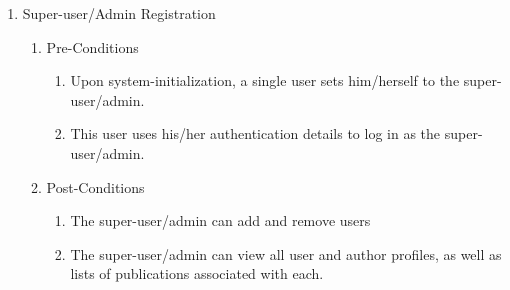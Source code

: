 \documentclass[hidelinks,a4paper,12pt]{article}
\begin{document}
	\noindent  
	
	\begin{enumerate}
		\item  Super-user/Admin Registration
		
		\begin{enumerate}
			\item  Pre-Conditions
			
			\begin{enumerate}
				\item  Upon system-initialization, a single user sets him/herself to the super-user/admin.
				
				\item  This user uses his/her authentication details to log in as the super-user/admin.
			\end{enumerate}
			
			\item  Post-Conditions
			
			\begin{enumerate}
				\item  The super-user/admin can add and remove users
				
				\item  The super-user/admin can view all user and author profiles, as well as lists of publications associated with each.
			\end{enumerate}
		\end{enumerate}
	\end{enumerate}
	
	\noindent  
	
\end{document}
